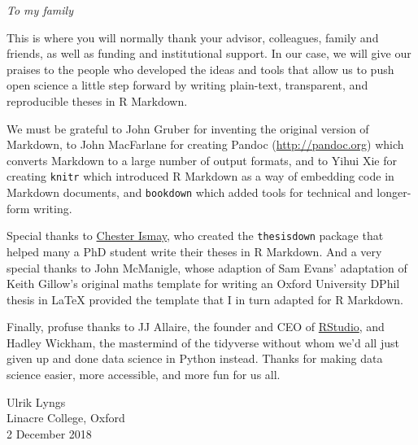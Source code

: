 \documentclass[a4paper, nobind]{templates/ociamthesis}
\begin{document}
\begin{romanpages}



\begin{dedication}
  \emph{To my family}
\end{dedication}

\begin{acknowledgements}
 	This is where you will normally thank your advisor, colleagues, family and friends, as well as funding and institutional support. In our case, we will give our praises to the people who developed the ideas and tools that allow us to push open science a little step forward by writing plain-text, transparent, and reproducible theses in R Markdown.

We must be grateful to John Gruber for inventing the original version of Markdown, to John MacFarlane for creating Pandoc (\url{http://pandoc.org}) which converts Markdown to a large number of output formats, and to Yihui Xie for creating \texttt{knitr} which introduced R Markdown as a way of embedding code in Markdown documents, and \texttt{bookdown} which added tools for technical and longer-form writing.

Special thanks to \href{http://chester.rbind.io}{Chester Ismay}, who created the \texttt{thesisdown} package that helped many a PhD student write their theses in R Markdown. And a very special thanks to John McManigle, whose adaption of Sam Evans' adaptation of Keith Gillow's original maths template for writing an Oxford University DPhil thesis in LaTeX provided the template that I in turn adapted for R Markdown.

Finally, profuse thanks to JJ Allaire, the founder and CEO of \href{http://rstudio.com}{RStudio}, and Hadley Wickham, the mastermind of the tidyverse without whom we'd all just given up and done data science in Python instead. Thanks for making data science easier, more accessible, and more fun for us all.

\begin{flushright}
Ulrik Lyngs \\
Linacre College, Oxford \\
2 December 2018
\end{flushright}
\end{acknowledgements}



\end{romanpages}
\end{document}

